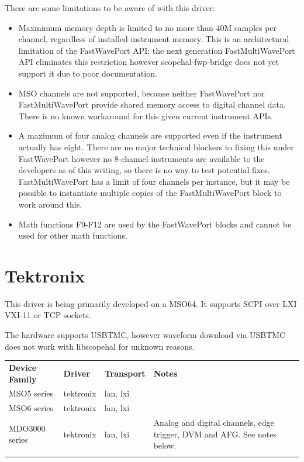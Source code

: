 There are some limitations to be aware of with this driver:
\begin{itemize}

\item Maxmimum memory depth is limited to no more than 40M samples per channel, regardless of installed instrument
memory. This is an architectural limitation of the FastWavePort API; the next generation FastMultiWavePort API eliminates
this restriction however scopehal-fwp-bridge does not yet support it due to poor documentation.

\item MSO channels are not supported, because neither FastWavePort nor FastMultiWavePort provide shared memory access to
digital channel data. There is no known workaround for this given current instrument APIs.

\item A maximum of four analog channels are supported even if the instrument actually has eight. There are no major
technical blockers to fixing this under FastWavePort however no 8-channel instruments are available to the developers as
of this writing, so there is no way to test potential fixes. FastMultiWavePort has a limit of four channels per instance,
but it may be possible to instantiate multiple copies of the FastMultiWavePort block to work around this.

\item Math functions F9-F12 are used by the FastWavePort blocks and cannot be used for other math functions.

\end{itemize}

\section{Tektronix}

This driver is being primarily developed on a MSO64. It supports SCPI over LXI VXI-11 or TCP sockets.

The hardware supports USBTMC, however waveform download via USBTMC does not work with libscopehal for unknown reasons.

\begin{tabularx}{16cm}{lllX}
\thickhline
\textbf{Device Family} & \textbf{Driver} & \textbf{Transport} & \textbf{Notes} \\
\thickhline
MSO5 series & tektronix & lan, lxi &  \\
\thinhline
MSO6 series & tektronix & lan, lxi &  \\
\thinhline
MDO3000 series & tektronix & lan, lxi & Analog and digital channels, edge trigger, DVM and AFG. See notes below. \\
\thickhline
\end{tabularx}

